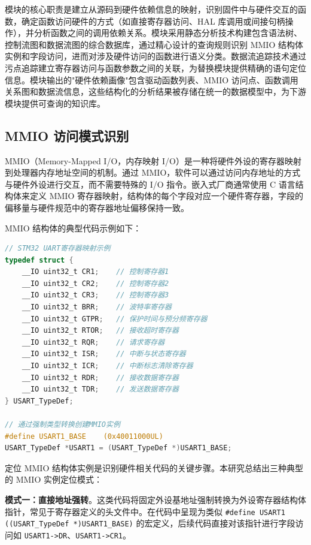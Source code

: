 模块的核心职责是建立从源码到硬件依赖信息的映射，识别固件中与硬件交互的函数，确定函数访问硬件的方式（如直接寄存器访问、HAL 库调用或间接句柄操作），并分析函数之间的调用依赖关系。模块采用静态分析技术构建包含语法树、控制流图和数据流图的综合数据库，通过精心设计的查询规则识别 MMIO 结构体实例和字段访问，进而对涉及硬件访问的函数进行语义分类。数据流追踪技术通过污点追踪建立寄存器访问与函数参数之间的关联，为替换模块提供精确的语句定位信息。模块输出的"硬件依赖画像"包含驱动函数列表、MMIO 访问点、函数调用关系图和数据流信息，这些结构化的分析结果被存储在统一的数据模型中，为下游模块提供可查询的知识库。

\subsection{MMIO 访问模式识别}

MMIO（Memory-Mapped I/O，内存映射 I/O）是一种将硬件外设的寄存器映射到处理器内存地址空间的机制。通过 MMIO，软件可以通过访问内存地址的方式与硬件外设进行交互，而不需要特殊的 I/O 指令。嵌入式厂商通常使用 C 语言结构体来定义 MMIO 寄存器映射，结构体的每个字段对应一个硬件寄存器，字段的偏移量与硬件规范中的寄存器地址偏移保持一致。

MMIO 结构体的典型代码示例如下：

\begin{lstlisting}[style=CStyle,language=C,caption=MMIO 结构体示例,label=lst:mmio-struct]
// STM32 UART寄存器映射示例
typedef struct {
    __IO uint32_t CR1;    // 控制寄存器1
    __IO uint32_t CR2;    // 控制寄存器2
    __IO uint32_t CR3;    // 控制寄存器3
    __IO uint32_t BRR;    // 波特率寄存器
    __IO uint32_t GTPR;   // 保护时间与预分频寄存器
    __IO uint32_t RTOR;   // 接收超时寄存器
    __IO uint32_t RQR;    // 请求寄存器
    __IO uint32_t ISR;    // 中断与状态寄存器
    __IO uint32_t ICR;    // 中断标志清除寄存器
    __IO uint32_t RDR;    // 接收数据寄存器
    __IO uint32_t TDR;    // 发送数据寄存器
} USART_TypeDef;

// 通过强制类型转换创建MMIO实例
#define USART1_BASE    (0x40011000UL)
USART_TypeDef *USART1 = (USART_TypeDef *)USART1_BASE;
\end{lstlisting}

定位 MMIO 结构体实例是识别硬件相关代码的关键步骤。本研究总结出三种典型的 MMIO 实例定位模式：

\textbf{模式一：直接地址强转}。这类代码将固定外设基地址强制转换为外设寄存器结构体指针，常见于寄存器定义的头文件中。在代码中呈现为类似 \texttt{\#define USART1 ((USART\_TypeDef *)USART1\_BASE)} 的宏定义，后续代码直接对该指针进行字段访问如 \texttt{USART1->DR}、\texttt{USART1->CR1}。

